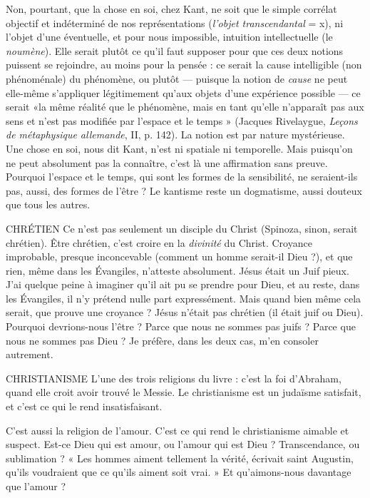 Non, pourtant, que la chose en soi, chez Kant, ne soit que le simple corrélat
objectif et indéterminé de nos représentations ({\it l'objet transcendantal} = x), ni
l’objet d’une éventuelle, et pour nous impossible, intuition intellectuelle (le
{\it noumène}). Elle serait plutôt ce qu’il faut supposer pour que ces deux notions
puissent se rejoindre, au moins pour la pensée : ce serait la cause intelligible
(non phénoménale) du phénomène, ou plutôt — puisque la notion de {\it cause} ne
peut elle-même s'appliquer légitimement qu’aux objets d’une expérience possible —
ce serait «la même réalité que le phénomène, mais en tant qu’elle
n'apparaît pas aux sens et n’est pas modifiée par l’espace et le temps » (Jacques
Rivelaygue, {\it Leçons de métaphysique allemande}, II, p. 142). La notion est par
nature mystérieuse. Une chose en soi, nous dit Kant, n’est ni spatiale ni temporelle.
Mais puisqu'on ne peut absolument pas la connaître, c’est là une affirmation
sans preuve. Pourquoi l’espace et le temps, qui sont les formes de la
sensibilité, ne seraient-ils pas, aussi, des formes de l'être ? Le kantisme reste un
dogmatisme, aussi douteux que tous les autres.

CHRÉTIEN Ce n’est pas seulement un disciple du Christ (Spinoza, sinon,
serait chrétien). Être chrétien, c’est croire en la {\it divinité} du
Christ. Croyance improbable, presque inconcevable (comment un homme
serait-il Dieu ?), et que rien, même dans les Évangiles, n’atteste absolument.
Jésus était un Juif pieux. J'ai quelque peine à imaginer qu’il ait pu se prendre
pour Dieu, et au reste, dans les Évangiles, il n’y prétend nulle part expressément.
Mais quand bien même cela serait, que prouve une croyance ?
Jésus n’était pas chrétien (il était juif ou Dieu). Pourquoi devrions-nous
l'être ? Parce que nous ne sommes pas juifs ? Parce que nous ne sommes pas
Dieu ? Je préfère, dans les deux cas, m’en consoler autrement.

CHRISTIANISME  L’une des trois religions du livre : c’est la foi d'Abraham,
quand elle croit avoir trouvé le Messie. Le christianisme
est un judaïsme satisfait, et c’est ce qui le rend insatisfaisant.

C’est aussi la religion de l’amour. C’est ce qui rend le christianisme aimable
et suspect. Est-ce Dieu qui est amour, ou l'amour qui est Dieu ? Transcendance,
ou sublimation ? « Les hommes aiment tellement la vérité, écrivait saint
Augustin, qu’ils voudraient que ce qu’ils aiment soit vrai. » Et qu’aimons-nous
davantage que l'amour ?

